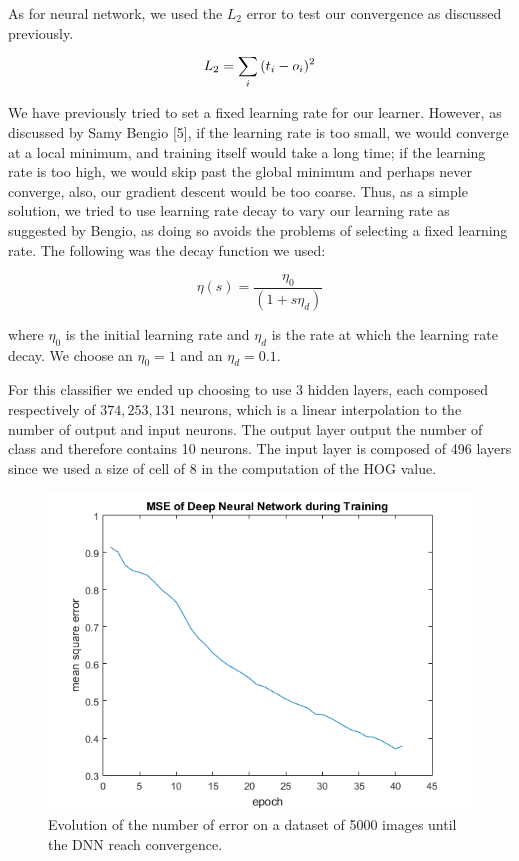 \documentclass{article} %
\begin{document}
As for neural network, we used the $L_2$ error to test our convergence as discussed previously.
 $$L_2 = \sum^{}_{i}{(t_i-o_i)^2}$$

We have previously tried to set a fixed learning rate for our learner. However, as discussed by Samy Bengio [5], if the learning rate is too small, we would converge at a local minimum, and training itself would take a long time; if the learning rate is too high, we would skip past the global minimum and perhaps never converge, also, our gradient descent would be too coarse. Thus, as a simple solution, we tried to use learning rate decay to vary our learning rate as suggested by Bengio, as doing so avoids the problems of selecting a fixed learning rate. The following was the decay function we used:

$$\eta(s)=\dfrac{\eta_0}{(1+s\eta_d)}$$ 

where $\eta_0$ is the initial learning rate and $\eta_d$ is the rate at which the learning rate decay. 
We choose an $\eta_0 = 1$ and an $\eta_d = 0.1$.

For this classifier we ended up choosing to use 3 hidden layers, each composed respectively of $374, 253, 131$ neurons, which is a linear interpolation to the number of output and input neurons. The output layer output the number of class and therefore contains 10 neurons. The input layer is composed of 496 layers since we used a size of cell of 8 in the computation of the HOG value. 

\begin{figure}
\centering
\includegraphics[scale=0.55]{dnn_train.png}
\caption{Evolution of the number of error on a dataset of 5000 images until the DNN reach convergence. }
\end{figure}
\end{document}
